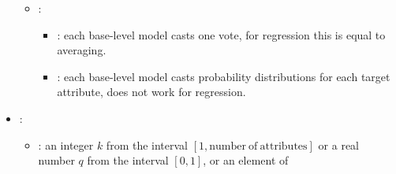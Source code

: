 \begin{itemize}
\begin{itemize}
                \item \optionDescrption{}:
                	\begin{itemize}
                		\item {}: each base-level model casts one vote, for regression this is equal to averaging.
                		\item {}: each base-level model casts probability distributions for each target attribute, does not work for regression.
                	\end{itemize}
           \end{itemize}
    \item {}:
           \begin{itemize}
                \item \optionPossibleValues{}: an integer $k$ from the interval $[1, \mathrm{number\ of\ attributes}]$ or a real number $q$ from the interval $[0, 1]$, or an element
                of %


\end{itemize}
\end{itemize}
